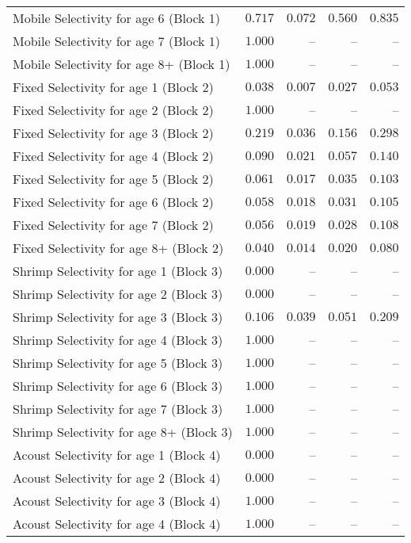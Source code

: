 \documentclass[
]{article}
\begin{document}
\begin{landscape}
\begin{longtable}[t]{lrrrr}
Mobile Selectivity for age 6 (Block 1) & $0.717$ & $0.072$ & $0.560$ & $0.835$\\
Mobile Selectivity for age 7 (Block 1) & $1.000$ & -- & -- & --\\
\addlinespace
Mobile Selectivity for age 8+ (Block 1) & $1.000$ & -- & -- & --\\
Fixed Selectivity for age 1 (Block 2) & $0.038$ & $0.007$ & $0.027$ & $0.053$\\
Fixed Selectivity for age 2 (Block 2) & $1.000$ & -- & -- & --\\
Fixed Selectivity for age 3 (Block 2) & $0.219$ & $0.036$ & $0.156$ & $0.298$\\
Fixed Selectivity for age 4 (Block 2) & $0.090$ & $0.021$ & $0.057$ & $0.140$\\
\addlinespace
Fixed Selectivity for age 5 (Block 2) & $0.061$ & $0.017$ & $0.035$ & $0.103$\\
Fixed Selectivity for age 6 (Block 2) & $0.058$ & $0.018$ & $0.031$ & $0.105$\\
Fixed Selectivity for age 7 (Block 2) & $0.056$ & $0.019$ & $0.028$ & $0.108$\\
Fixed Selectivity for age 8+ (Block 2) & $0.040$ & $0.014$ & $0.020$ & $0.080$\\
Shrimp Selectivity for age 1 (Block 3) & $0.000$ & -- & -- & --\\
\addlinespace
Shrimp Selectivity for age 2 (Block 3) & $0.000$ & -- & -- & --\\
Shrimp Selectivity for age 3 (Block 3) & $0.106$ & $0.039$ & $0.051$ & $0.209$\\
Shrimp Selectivity for age 4 (Block 3) & $1.000$ & -- & -- & --\\
Shrimp Selectivity for age 5 (Block 3) & $1.000$ & -- & -- & --\\
Shrimp Selectivity for age 6 (Block 3) & $1.000$ & -- & -- & --\\
\addlinespace
Shrimp Selectivity for age 7 (Block 3) & $1.000$ & -- & -- & --\\
Shrimp Selectivity for age 8+ (Block 3) & $1.000$ & -- & -- & --\\
Acoust Selectivity for age 1 (Block 4) & $0.000$ & -- & -- & --\\
Acoust Selectivity for age 2 (Block 4) & $0.000$ & -- & -- & --\\
Acoust Selectivity for age 3 (Block 4) & $1.000$ & -- & -- & --\\
\addlinespace
Acoust Selectivity for age 4 (Block 4) & $1.000$ & -- & -- & --\\

\end{longtable}
\end{landscape}
\end{document}
